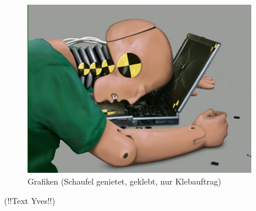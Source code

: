 \begin{figure}
	\centering
	\includegraphics[width=0.9\textwidth]{Enddokumentation/CrashTestDummy.jpg}
	\caption{Grafiken (Schaufel genietet, geklebt, nur Klebauftrag)}
	\label{fig:Grafiken (Schaufel genietet, geklebt, nur Klebauftrag)}	
\end{figure}
(!!Text Yves!!)